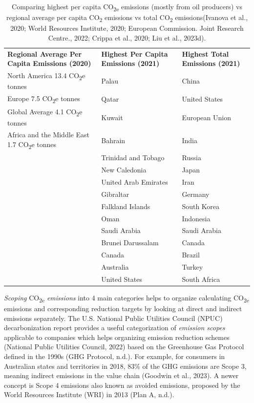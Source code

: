 \documentclass[
  letterpaper,
  DIV=11,
  numbers=noendperiod]{scrartcl}
\begin{document}
\begin{longtable}[]{@{}
  >{\raggedright\arraybackslash}p{}
  >{\raggedright\arraybackslash}p{}
  >{\raggedright\arraybackslash}p{}@{}}
\caption{Comparing highest per capita CO\textsubscript{2e} emissions
(mostly from oil producers) vs regional average per capita
CO\textsubscript{2} emissions vs total CO\textsubscript{2}
emissions(Ivanova et al., 2020; World Resources Institute, 2020;
European Commission. Joint Research Centre., 2022; Crippa et al., 2020;
Liu et al., 2023d).}\tabularnewline
\toprule\noalign{}
\endfirsthead
\endhead
\bottomrule\noalign{}
\endlastfoot
\textbf{Regional Average Per Capita Emissions (2020)} & \textbf{Highest
Per Capita Emissions (2021)} & \textbf{Highest Total Emissions
(2021)} \\
North America 13.4 CO\textsubscript{2}e tonnes & Palau & China \\
Europe 7.5 CO\textsubscript{2}e tonnes & Qatar & United States \\
Global Average 4.1 CO\textsubscript{2}e tonnes & Kuwait & European
Union \\
Africa and the Middle East 1.7 CO\textsubscript{2}e tonnes & Bahrain &
India \\
& Trinidad and Tobago & Russia \\
& New Caledonia & Japan \\
& United Arab Emirates & Iran \\
& Gibraltar & Germany \\
& Falkland Islands & South Korea \\
& Oman & Indonesia \\
& Saudi Arabia & Saudi Arabia \\
& Brunei Darussalam & Canada \\
& Canada & Brazil \\
& Australia & Turkey \\
& United States & South Africa \\
\end{longtable}

\emph{Scoping} CO\textsubscript{2e} \emph{emissions} into 4 main
categories helps to organize calculating CO\textsubscript{2e} emissions
and corresponding reduction targets by looking at direct and indirect
emissions separately. The U.S. National Public Utilities Council (NPUC)
decarbonization report provides a useful categorization of
\emph{emission scopes} applicable to companies which helps organizing
emission reduction schemes (National Public Utilities Council, 2022)
based on the Greenhouse Gas Protocol defined in the 1990s (GHG Protocol,
n.d.). For example, for consumers in Australian states and territories
in 2018, 83\% of the GHG emissions are Scope 3, meaning indirect
emissions in the value chain (Goodwin et al., 2023). A newer concept is
Scope 4 emissions also known as avoided emissions, proposed by the World
Resources Institute (WRI) in 2013 (Plan A, n.d.).
\end{document}
